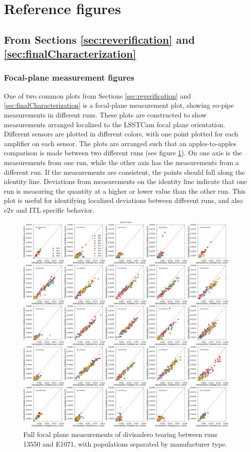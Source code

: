 \section{Reference figures}

\subsection{From Sections \ref{sec:reverification} and \ref{sec:finalCharacterization}}
\subsubsection{Focal-plane measurement figures}

One of two common plots from Sections \ref{sec:reverification} and \ref{sec:finalCharacterization} is a focal-plane measurement plot, showing eo-pipe measurements in different runs. These plots are constructed to show measurements arranged localized to the LSSTCam focal plane orientation. Different sensors are plotted in different colors, with one point plotted for each amplifier on each sensor. The plots are arranged such that an apples-to-apples comparison is made between two different runs (see figure \ref{fig:ref:eoPipeFP_5x5}). On one axis is the measurements from one run, while the other axis has the measurements from a different run. If the measurements are consistent, the points should fall along the identity line. Deviations from measurements on the identity line indicate that one run is measuring the quantity at a higher or lower value than the other run. This plot is useful for identifying localized deviations between different runs, and also e2v and ITL specific behavior.

\begin{figure}
    \centering
    \includegraphics[width=0.5\linewidth]{figures/baselineCharacterization/13550_E1071_DIVISADERO_TEARING_inset.png}
    \caption{Full focal plane measurements of divisadero tearing between runs 13550 and E1071, with populations separated by manufacturer type.}
    \label{fig:ref:eoPipeFP_5x5}
\end{figure}

